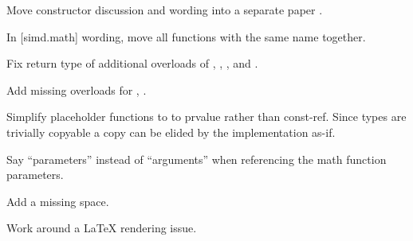 \begin{revision}
\item Move  constructor discussion and wording into a separate paper \parencite{P4012R0}.
\item In [simd.math] wording, move all functions with the same name together.
\item Fix return type of additional overloads of ,
  , , and .
\item Add missing overloads for , .
\item Simplify placeholder functions to  to prvalue rather than const-ref.
  Since  types are trivially copyable a copy can be elided by
  the implementation as-if.
\item Say “parameters” instead of “arguments” when referencing the math function parameters.
\item Add a missing space.
\item Work around a \LaTeX{} rendering issue.
\end{revision}

